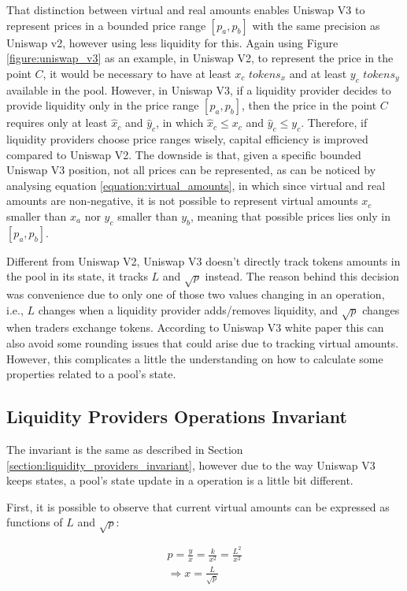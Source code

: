 \documentclass{article}
\begin{document}
That distinction between virtual and real amounts enables Uniswap V3 to represent prices in a bounded price range $[p_a, p_b]$ with the same precision as Uniswap v2, however using less liquidity for this.
Again using Figure \ref{figure:uniswap_v3} as an example, in Uniswap V2, to represent the price in the point $C$, it would be necessary to have at least $x_c$ $tokens_x$ and at least $y_c$ $tokens_y$ available in the pool.
However, in Uniswap V3, if a liquidity provider decides to provide liquidity only in the price range $[p_a, p_b]$, then the price in the point $C$ requires only at least $\hat{x}_c$ and $\hat{y}_c$, in which $\hat{x}_c \leq x_c$ and $\hat{y}_c \leq y_c$.
Therefore, if liquidity providers choose price ranges wisely, capital efficiency is improved compared to Uniswap V2.
The downside is that, given a specific bounded Uniswap V3 position, not all prices can be represented, as can be noticed by analysing equation \ref{equation:virtual_amounts}, in which since virtual and real amounts are non-negative, it is not possible to represent virtual amounts $x_c$ smaller than $x_a$ nor $y_c$ smaller than $y_b$, meaning that possible prices lies only in $[p_a, p_b]$.

Different from Uniswap V2, Uniswap V3 doesn't directly track tokens amounts in the pool in its state, it tracks $L$ and $\sqrt{p}$ instead.
The reason behind this decision was convenience due to only one of those two values changing in an operation, i.e., $L$ changes when a liquidity provider adds/removes liquidity, and $\sqrt{p}$ changes when traders exchange tokens.
According to Uniswap V3 white paper this can also avoid some rounding issues that could arise due to tracking virtual amounts.
However, this complicates a little the understanding on how to calculate some properties related to a pool's state.

\subsection{Liquidity Providers Operations Invariant}

The invariant is the same as described in Section \ref{section:liquidity_providers_invariant}, however due to the way Uniswap V3 keeps states, a pool's state update in a operation is a little bit different.

First, it is possible to observe that current virtual amounts can be expressed as functions of $L$ and $\sqrt{p}$:

\begin{equation}
    \label{equation:x}
    \begin{split}
        p=\frac{y}{x}=\frac{k}{x^2}=\frac{L^2}{x^2} \\
        \Rightarrow x=\frac{L}{\sqrt{p}}
    \end{split}
\end{equation}
\end{document}
